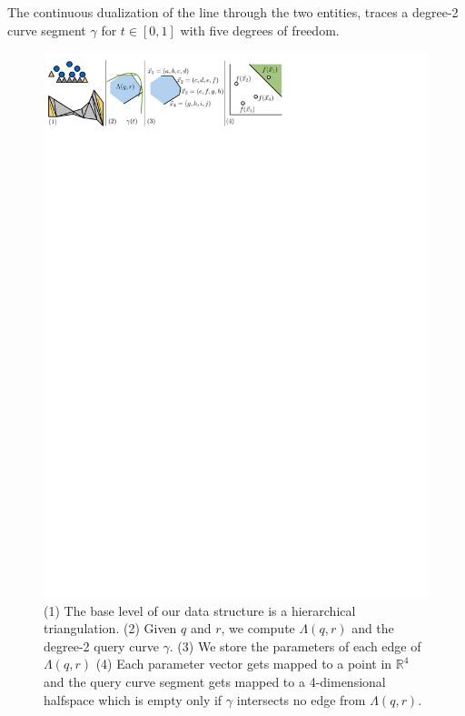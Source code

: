 \documentclass[UKenglish]{lipics-v2019}
\begin{document}
\begin{lemma}
\label{lemma:hyperbola}
  The continuous dualization of the line through the two entities, traces a degree-2 curve segment $\gamma$ for $t \in [0,1]$ with five degrees of freedom.
\end{lemma}


\begin{figure}[h]
    \centering
    \includegraphics[]{../panel}
    \caption{(1) The base level of our data structure is a hierarchical triangulation. (2) Given $q$ and $r$, we compute $\Lambda(q,r)$ and the degree-2 query curve $\gamma$. (3) We store the parameters of each edge of $\Lambda(q,r)$ (4) Each parameter vector gets mapped to a point in $\mathbb{R}^4$ and the query curve segment gets mapped to a 4-dimensional halfspace which is empty only if $\gamma$ intersects no edge from $\Lambda(q,r)$.}
    \label{fig:panel}
\end{figure}
\end{document}
